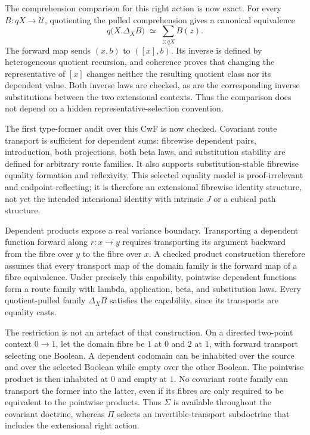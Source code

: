 \documentclass[11pt]{article}
\theoremstyle{definition}
\theoremstyle{remark}
\begin{document}
The comprehension comparison for this right action is now exact.  For every
$B:qX\to\mathcal U$, quotienting the pulled comprehension gives a canonical
equivalence
\[
  q\bigl(X.\Delta_XB\bigr)\;\simeq\;
  \sum_{z:qX} B(z).
\]
The forward map sends $(x,b)$ to $([x],b)$.  Its inverse is defined by
heterogeneous quotient recursion, and coherence proves that changing the
representative of $[x]$ changes neither the resulting quotient class nor its
dependent value.  Both inverse laws are checked, as are the corresponding
inverse substitutions between the two extensional contexts.  Thus the
comparison does not depend on a hidden representative-selection convention.

The first type-former audit over this CwF is now checked.  Covariant route
transport is sufficient for dependent sums: fibrewise dependent pairs,
introduction, both projections, both beta laws, and substitution stability are
defined for arbitrary route families.  It also supports substitution-stable
fibrewise equality formation and reflexivity.  This selected equality model is
proof-irrelevant and endpoint-reflecting; it is therefore an extensional
fibrewise identity structure, not yet the intended intensional identity with
intrinsic $J$ or a cubical path structure.

Dependent products expose a real variance boundary.  Transporting a dependent
function forward along $r:x\to y$ requires transporting its argument backward
from the fibre over $y$ to the fibre over $x$.  A checked product construction
therefore assumes that every transport map of the domain family is the forward
map of a fibre equivalence.  Under precisely this capability, pointwise
dependent functions form a route family with lambda, application, beta, and
substitution laws.  Every quotient-pulled family $\Delta_XB$ satisfies the
capability, since its transports are equality casts.

The restriction is not an artefact of that construction.  On a directed
two-point context $0\to1$, let the domain fibre be $1$ at $0$ and $2$ at $1$,
with forward transport selecting one Boolean.  A dependent codomain can be
inhabited over the source and over the selected Boolean while empty over the
other Boolean.  The pointwise product is then inhabited at $0$ and empty at
$1$.  No covariant route family can transport the former into the latter, even
if its fibres are only required to be equivalent to the pointwise products.
Thus $\Sigma$ is available throughout the covariant doctrine, whereas $\Pi$
selects an invertible-transport subdoctrine that includes the extensional
right action.
\end{document}
